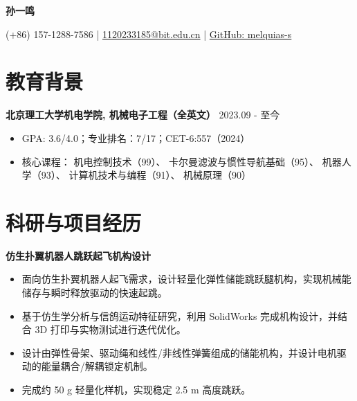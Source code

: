 \documentclass[10pt,a4paper]{article}
\begin{document}

\begin{center}

{\fontsize{18pt}{20pt}\selectfont
\textbf{孙一鸣}
}

\vspace{6pt}

(+86) 157-1288-7586
\quad | \quad
\href{mailto:1120233185@bit.edu.cn}{1120233185@bit.edu.cn}
\quad | \quad
\href{https://github.com/melquias-s}{GitHub: melquias-s}

\end{center}



\section{教育背景}


\textbf{北京理工大学机电学院, 机械电子工程（全英文）}
\hfill
2023.09 - 至今


\begin{itemize}

\item 
GPA: 3.6/4.0；专业排名：7/17；CET-6:557（2024）

\item 
核心课程：
机电控制技术（99）、
卡尔曼滤波与惯性导航基础（95）、
机器人学（93）、
计算机技术与编程（91）、
机械原理（90）

\end{itemize}




\section{科研与项目经历}



\textbf{仿生扑翼机器人跳跃起飞机构设计}

\begin{itemize}

\item
面向仿生扑翼机器人起飞需求，设计轻量化弹性储能跳跃腿机构，实现机械能储存与瞬时释放驱动的快速起跳。

\item
基于仿生学分析与信鸽运动特征研究，利用 SolidWorks 完成机构设计，并结合 3D 打印与实物测试进行迭代优化。

\item
设计由弹性骨架、驱动绳和线性/非线性弹簧组成的储能机构，并设计电机驱动的能量耦合/解耦锁定机制。

\item
完成约 50 g 轻量化样机，实现稳定 2.5 m 高度跳跃。

\end{itemize}
\end{document}
